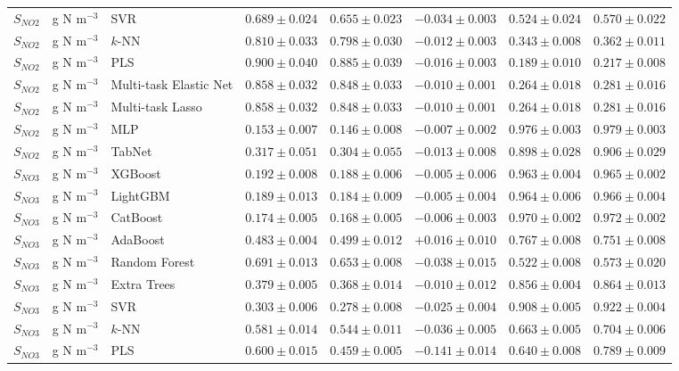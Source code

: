 \begin{longtable}{llp{3.1cm}rrrrr}
$S_{NO2}$ & g N m$^{-3}$ & SVR & $0.689\pm0.024$ & $0.655\pm0.023$ & $-0.034\pm0.003$ & $0.524\pm0.024$ & $0.570\pm0.022$ \\
$S_{NO2}$ & g N m$^{-3}$ & $k$-NN & $0.810\pm0.033$ & $0.798\pm0.030$ & $-0.012\pm0.003$ & $0.343\pm0.008$ & $0.362\pm0.011$ \\
$S_{NO2}$ & g N m$^{-3}$ & PLS & $0.900\pm0.040$ & $0.885\pm0.039$ & $-0.016\pm0.003$ & $0.189\pm0.010$ & $0.217\pm0.008$ \\
$S_{NO2}$ & g N m$^{-3}$ & Multi-task Elastic Net & $0.858\pm0.032$ & $0.848\pm0.033$ & $-0.010\pm0.001$ & $0.264\pm0.018$ & $0.281\pm0.016$ \\
$S_{NO2}$ & g N m$^{-3}$ & Multi-task Lasso & $0.858\pm0.032$ & $0.848\pm0.033$ & $-0.010\pm0.001$ & $0.264\pm0.018$ & $0.281\pm0.016$ \\
$S_{NO2}$ & g N m$^{-3}$ & MLP & $0.153\pm0.007$ & $0.146\pm0.008$ & $-0.007\pm0.002$ & $0.976\pm0.003$ & $0.979\pm0.003$ \\
$S_{NO2}$ & g N m$^{-3}$ & TabNet & $0.317\pm0.051$ & $0.304\pm0.055$ & $-0.013\pm0.008$ & $0.898\pm0.028$ & $0.906\pm0.029$ \\
$S_{NO3}$ & g N m$^{-3}$ & XGBoost & $0.192\pm0.008$ & $0.188\pm0.006$ & $-0.005\pm0.006$ & $0.963\pm0.004$ & $0.965\pm0.002$ \\
$S_{NO3}$ & g N m$^{-3}$ & LightGBM & $0.189\pm0.013$ & $0.184\pm0.009$ & $-0.005\pm0.004$ & $0.964\pm0.006$ & $0.966\pm0.004$ \\
$S_{NO3}$ & g N m$^{-3}$ & CatBoost & $0.174\pm0.005$ & $0.168\pm0.005$ & $-0.006\pm0.003$ & $0.970\pm0.002$ & $0.972\pm0.002$ \\
$S_{NO3}$ & g N m$^{-3}$ & AdaBoost & $0.483\pm0.004$ & $0.499\pm0.012$ & $+0.016\pm0.010$ & $0.767\pm0.008$ & $0.751\pm0.008$ \\
$S_{NO3}$ & g N m$^{-3}$ & Random Forest & $0.691\pm0.013$ & $0.653\pm0.008$ & $-0.038\pm0.015$ & $0.522\pm0.008$ & $0.573\pm0.020$ \\
$S_{NO3}$ & g N m$^{-3}$ & Extra Trees & $0.379\pm0.005$ & $0.368\pm0.014$ & $-0.010\pm0.012$ & $0.856\pm0.004$ & $0.864\pm0.013$ \\
$S_{NO3}$ & g N m$^{-3}$ & SVR & $0.303\pm0.006$ & $0.278\pm0.008$ & $-0.025\pm0.004$ & $0.908\pm0.005$ & $0.922\pm0.004$ \\
$S_{NO3}$ & g N m$^{-3}$ & $k$-NN & $0.581\pm0.014$ & $0.544\pm0.011$ & $-0.036\pm0.005$ & $0.663\pm0.005$ & $0.704\pm0.006$ \\
$S_{NO3}$ & g N m$^{-3}$ & PLS & $0.600\pm0.015$ & $0.459\pm0.005$ & $-0.141\pm0.014$ & $0.640\pm0.008$ & $0.789\pm0.009$ \\

\end{longtable}
